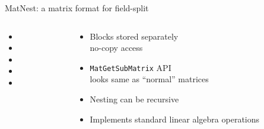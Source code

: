 \begin{frame}{MatNest: a matrix format for field-split}
\begin{columns}
\begin{column}{0.65\textwidth}
\begin{itemize}
      \item {}
      \item {}
      \item {}
      \item {}
      \item {}
      \end{itemize}
    \end{column}
    \begin{column}{0.37\textwidth}
      \begin{itemize}
      \item Blocks stored separately \\
        no-copy access 
      \item \texttt{MatGetSubMatrix} API \\
        looks same as ``normal'' matrices
      \item Nesting can be recursive
      \item Implements standard linear algebra operations
      \end{itemize}
    \end{column}
  \end{columns}
\end{frame}
